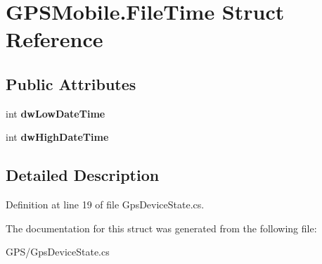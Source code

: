 \hypertarget{struct_g_p_s_mobile_1_1_file_time}{
\section{GPSMobile.FileTime Struct Reference}
\label{struct_g_p_s_mobile_1_1_file_time}
}
\subsection*{Public Attributes}
\begin{DoxyCompactItemize}
\item 
\hypertarget{struct_g_p_s_mobile_1_1_file_time_abb4eeadc6601a6b01ee63a3f2e359a20}{
int {\bfseries dwLowDateTime}}
\label{struct_g_p_s_mobile_1_1_file_time_abb4eeadc6601a6b01ee63a3f2e359a20}

\item 
\hypertarget{struct_g_p_s_mobile_1_1_file_time_af861bb61f181a64140c88c98334e0624}{
int {\bfseries dwHighDateTime}}
\label{struct_g_p_s_mobile_1_1_file_time_af861bb61f181a64140c88c98334e0624}

\end{DoxyCompactItemize}


\subsection{Detailed Description}


Definition at line 19 of file GpsDeviceState.cs.

The documentation for this struct was generated from the following file:\begin{DoxyCompactItemize}
\item 
GPS/GpsDeviceState.cs\end{DoxyCompactItemize}
